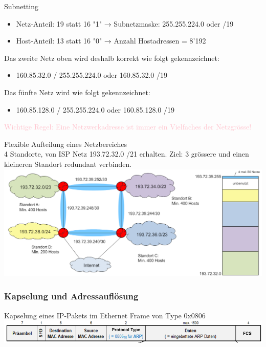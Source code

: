 \begin{concept}{Subnetting}
    \begin{itemize}
        \item Netz-Anteil: 19 statt 16 "1" → Subnetzmaske: 255.255.224.0 oder /19
        \item Host-Anteil: 13 statt 16 "0" → Anzahl Hostadressen = 8'192
    \end{itemize}
    Das zweite Netz oben wird deshalb korrekt wie folgt gekennzeichnet:
    \begin{itemize}
        \item 160.85.32.0 / 255.255.224.0 oder 160.85.32.0 /19
    \end{itemize}
    Das fünfte Netz wird wie folgt gekennzeichnet:
    \begin{itemize}
        \item 160.85.128.0 / 255.255.224.0 oder 160.85.128.0 /19
    \end{itemize}
    \textcolor{pink}{Wichtige Regel: Eine Netzwerkadresse ist immer ein Vielfaches der Netzgrösse!}
\end{concept}

\begin{example2}{Flexible Aufteilung eines Netzbereiches}\\
    4 Standorte, von ISP Netz 193.72.32.0 /21 erhalten. Ziel: 3 grössere und einen kleineren Standort redundant verbinden.\\
        \includegraphics[width=1\linewidth]{images/flexible_aufteilung_netzbereich.png}    
\end{example2}





\columnbreak

\subsubsection{Kapselung und Adressauflösung}

\begin{definition}{Kapselung eines IP-Pakets im Ethernet Frame} von Type 0x0806\\
        \includegraphics[width=1\linewidth]{images/kapselung_ip_paket.png}
\end{definition}



